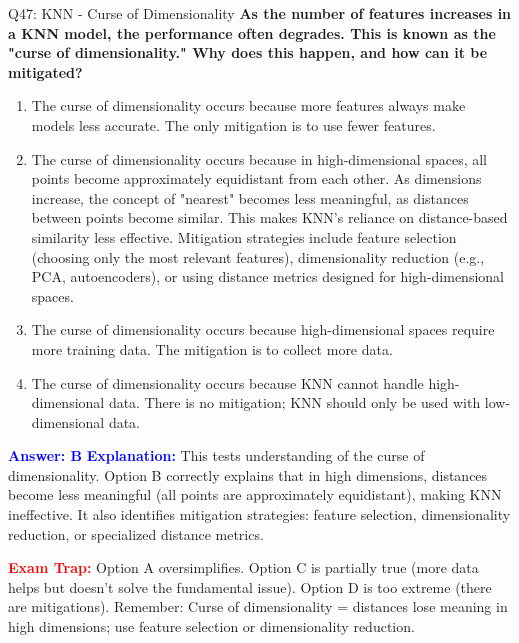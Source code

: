 \documentclass[8pt]{beamer}
\begin{document}
	\begin{frame}{Q47: KNN - Curse of Dimensionality}
		\fontsize{6.5}{7.5}\selectfont
		\textbf{As the number of features increases in a KNN model, the performance often degrades. This is known as the "curse of dimensionality." Why does this happen, and how can it be mitigated?}
		
		\begin{enumerate}
			\item The curse of dimensionality occurs because more features always make models less accurate. The only mitigation is to use fewer features.
			\item The curse of dimensionality occurs because in high-dimensional spaces, all points become approximately equidistant from each other. As dimensions increase, the concept of "nearest" becomes less meaningful, as distances between points become similar. This makes KNN's reliance on distance-based similarity less effective. Mitigation strategies include feature selection (choosing only the most relevant features), dimensionality reduction (e.g., PCA, autoencoders), or using distance metrics designed for high-dimensional spaces.
			\item The curse of dimensionality occurs because high-dimensional spaces require more training data. The mitigation is to collect more data.
			\item The curse of dimensionality occurs because KNN cannot handle high-dimensional data. There is no mitigation; KNN should only be used with low-dimensional data.
		\end{enumerate}
		
		\vspace{0.1cm}
		\textcolor{blue}{\textbf{Answer: B}}
		\vspace{0.1cm}
		\textcolor{blue}{\textbf{Explanation:}} This tests understanding of the curse of dimensionality. Option B correctly explains that in high dimensions, distances become less meaningful (all points are approximately equidistant), making KNN ineffective. It also identifies mitigation strategies: feature selection, dimensionality reduction, or specialized distance metrics.
		
		\textcolor{red}{\textbf{Exam Trap:}} Option A oversimplifies. Option C is partially true (more data helps but doesn't solve the fundamental issue). Option D is too extreme (there are mitigations). Remember: Curse of dimensionality = distances lose meaning in high dimensions; use feature selection or dimensionality reduction.
	\end{frame}
	
\end{document}
